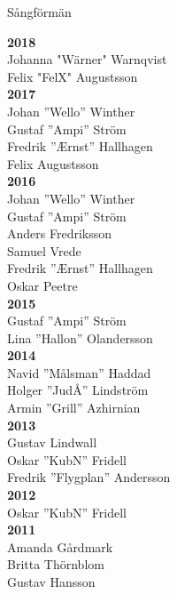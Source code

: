\begin{flushleft}
{\Huge Sångförmän}
\end{flushleft}

{\large
\setlength{\parskip}{0.8em}
\setlength\columnsep{3em}

\begin{multicols}{2}
\textbf{2018}\\
Johanna "Wärner" Warnqvist\\
Felix "FelX" Augustsson\\

\textbf{2017}\\
Johan ''Wello'' Winther\\
Gustaf ''Ampi'' Ström\\
Fredrik ''Ærnst'' Hallhagen\\
Felix Augustsson\\

\textbf{2016}\\
Johan ''Wello'' Winther\\
Gustaf ''Ampi'' Ström\\
Anders Fredriksson\\
Samuel Vrede\\
Fredrik ''Ærnst'' Hallhagen\\
Oskar Peetre\\

\textbf{2015}\\
Gustaf ''Ampi'' Ström\\
Lina ''Hallon'' Olandersson\\

\textbf{2014}\\
Navid ''Målsman'' Haddad\\
Holger ''JudÅ'' Lindström\\
Armin ''Grill'' Azhirnian\\

\textbf{2013}\\
Gustav Lindwall\\
Oskar ''KubN'' Fridell\\
Fredrik ''Flygplan'' Andersson\\

\textbf{2012}\\
Oskar ''KubN'' Fridell\\

\textbf{2011}\\
Amanda Gårdmark\\
Britta Thörnblom\\
Gustav Hansson\\


\end{multicols}}
